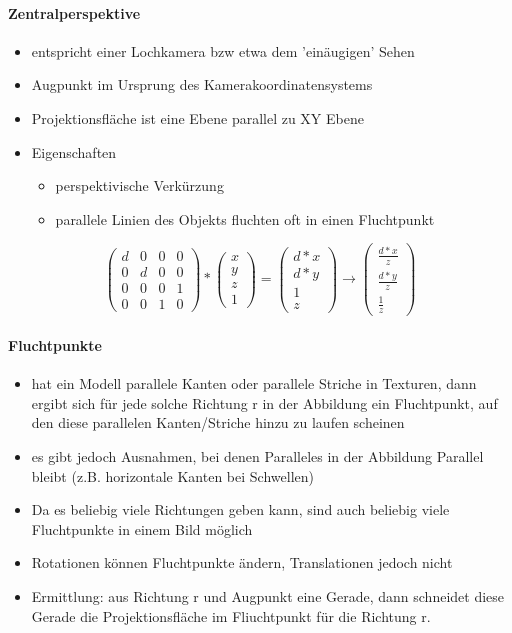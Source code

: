 \documentclass[10pt,landscape]{article}
\begin{document}
\begin{multicols}{3}
  \paragraph{Zentralperspektive}
  \begin{itemize}
    \item entspricht einer Lochkamera bzw etwa dem 'einäugigen' Sehen
    \item Augpunkt im Ursprung des Kamerakoordinatensystems
    \item Projektionsfläche ist eine Ebene parallel zu XY Ebene
    \item Eigenschaften
          \begin{itemize}
            \item perspektivische Verkürzung
            \item parallele Linien des Objekts fluchten oft in einen Fluchtpunkt
          \end{itemize}
  \end{itemize}
  $$\begin{pmatrix} d&0&0&0\\ 0&d&0&0 \\ 0&0&0&1 \\ 0&0&1&0 \end{pmatrix} * \begin{pmatrix}x\\y\\z\\1\end{pmatrix} = \begin{pmatrix} d*x\\ d*y\\ 1 \\ z \end{pmatrix} \rightarrow \begin{pmatrix} \frac{d*x}{z} \\ \frac{d*y}{z} \\ \frac{1}{z} \end{pmatrix}$$
  
  \paragraph{Fluchtpunkte}
  \begin{itemize}
    \item hat ein Modell parallele Kanten oder parallele Striche in Texturen, dann ergibt sich für jede solche Richtung r in der Abbildung ein Fluchtpunkt, auf den diese parallelen Kanten/Striche hinzu zu laufen scheinen
    \item es gibt jedoch Ausnahmen, bei denen Paralleles in der Abbildung Parallel bleibt (z.B. horizontale Kanten bei Schwellen)
    \item Da es beliebig viele Richtungen geben kann, sind auch beliebig viele Fluchtpunkte in einem Bild möglich
    \item Rotationen können Fluchtpunkte ändern, Translationen jedoch nicht
    \item Ermittlung: aus Richtung r und Augpunkt eine Gerade, dann schneidet diese Gerade die Projektionsfläche im Fliuchtpunkt für die Richtung r.
  \end{itemize}
  

\end{multicols}
\end{document}
